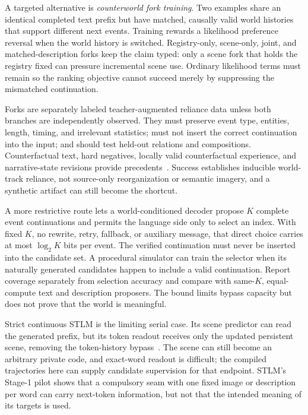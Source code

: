 \documentclass[11pt]{article}
\begin{document}
A targeted alternative is \emph{counterworld fork training}. Two examples share an identical completed text prefix but have matched, causally valid world histories that support different next events. Training rewards a likelihood preference reversal when the world history is switched. Registry-only, scene-only, joint, and matched-description forks keep the claim typed: only a scene fork that holds the registry fixed can pressure incremental scene use. Ordinary likelihood terms must remain so the ranking objective cannot succeed merely by suppressing the mismatched continuation.

Forks are separately labeled teacher-augmented reliance data unless both branches are independently observed. They must preserve event type, entities, length, timing, and irrelevant statistics; must not insert the correct continuation into the input; and should test held-out relations and compositions. Counterfactual text, hard negatives, locally valid counterfactual experience, and narrative-state revisions provide precedents~\cite{kaushik2020cad,yuksekgonul2023negclip,pitis2020coda,ghosh2023pasta}. Success establishes inducible world-track reliance, not source-only reorganization or semantic imagery, and a synthetic artifact can still become the shortcut.

A more restrictive route lets a world-conditioned decoder propose $K$ complete event continuations and permits the language side only to select an index. With fixed $K$, no rewrite, retry, fallback, or auxiliary message, that direct choice carries at most $\log_2 K$ bits per event. The verified continuation must never be inserted into the candidate set. A procedural simulator can train the selector when its naturally generated candidates happen to include a valid continuation. Report coverage separately from selection accuracy and compare with same-$K$, equal-compute text and description proposers. The bound limits bypass capacity but does not prove that the world is meaningful.

Strict continuous STLM is the limiting serial case. Its scene predictor can read the generated prefix, but its token readout receives only the updated persistent scene, removing the token-history bypass~\cite{westerberg2026stlm}. The scene can still become an arbitrary private code, and exact-word readout is difficult; the compiled trajectories here can supply candidate supervision for that endpoint. STLM's Stage-1 pilot shows that a compulsory seam with one fixed image or description per word can carry next-token information, but not that the intended meaning of its targets is used.
\end{document}
